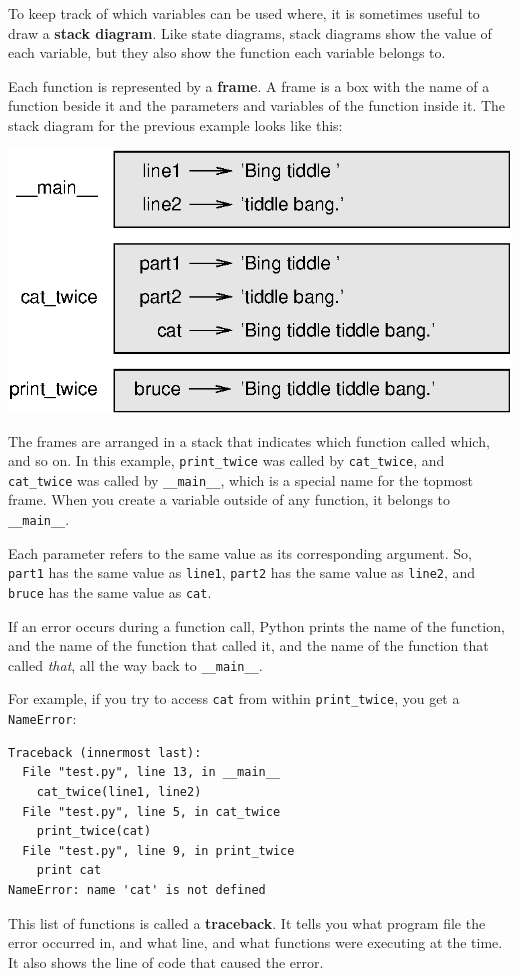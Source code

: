 \documentclass[10pt]{book}
\begin{document}
To keep track of which variables can be used where, it is sometimes
useful to draw a {\bf stack diagram}.  Like state diagrams, stack
diagrams show the value of each variable, but they also show the
function each variable belongs to.


Each function is represented by a {\bf frame}.  A frame is a box
with the name of a function
beside it and the parameters and variables of the function inside it.
The stack diagram for the
previous example looks like this:

\beforefig
\centerline{\includegraphics{figs/stack.eps}}
\afterfig

The frames are arranged in a stack that indicates which function
called which, and so on.  In this example, \verb"print_twice"
was called by \verb"cat_twice", and \verb"cat_twice" was called by 
\verb"__main__", which is a special name for the topmost frame.  When
you create a variable outside of any function, it belongs to 
\verb"__main__".

Each parameter refers to the same value as its corresponding
argument.  So, {\tt part1} has the same value as
{\tt line1}, {\tt part2} has the same value as {\tt line2},
and {\tt bruce} has the same value as {\tt cat}.

If an error occurs during a function call, Python prints the
name of the function, and the name of the function that called
it, and the name of the function that called {\em that}, all the
way back to \verb"__main__".

For example, if you try to access {\tt cat} from within 
\verb"print_twice", you get a {\tt NameError}:

\beforeverb
\begin{verbatim}
Traceback (innermost last):
  File "test.py", line 13, in __main__
    cat_twice(line1, line2)
  File "test.py", line 5, in cat_twice
    print_twice(cat)
  File "test.py", line 9, in print_twice
    print cat
NameError: name 'cat' is not defined
\end{verbatim}
\afterverb
%
This list of functions is called a {\bf traceback}.  It tells you what
program file the error occurred in, and what line, and what functions
were executing at the time.  It also shows the line of code that
caused the error.
\end{document}
